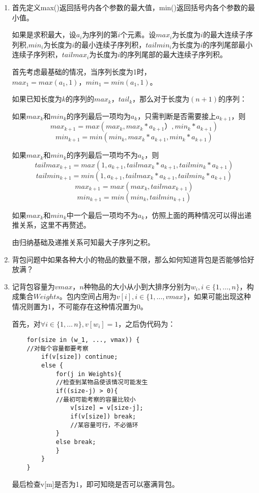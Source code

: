 \documentclass[12pt,a4paper]{article}
\makeatletter
\newtheorem*{solution}{Solution}
\theoremstyle{definition}
\renewenvironment{solution}[1][Solution] {\par\pushQED{\qed}\normalfont\topsep6\p@\@plus6\p@\relax\trivlist\item[\hskip\labelsep\bfseries#1\@addpunct{.}]\ignorespaces}{\popQED\endtrivlist\@endpefalse} \makeatother
\makeatother
\begin{document}
\begin{enumerate}
\begin{solution}
	首先定义max()返回括号内各个参数的最大值，min()返回括号内各个参数的最小值。
	
	如果是求积最大，设$a_i$为序列的第$i$个元素。设$max_{i}$为长度为$i$的最大连续子序列积,$min_{i}$为长度为$i$的最小连续子序列积，$tailmin_{i}$为长度为$i$的序列尾部最小连续子序列积，$tailmax_{i}$为长度为$i$的序列尾部的最大连续子序列积。

	首先考虑最基础的情况，当序列长度为1时，$max_{1}=max(a_1,1)，min_1=min(a_1,1)$。
	
	如果已知长度为$k$的序列的$max_{k}，tail_{k}$，那么对于长度为$(n+1)$的序列：
	
	如果$max_k$和$min_k$的序列最后一项均为$a_k$，只需判断是否需要接上$a_{k+1}$，则$$max_{k+1}=max(max_k,max_{k}*a_{k+1}）,min_{k}*a_{k+1})$$ $$min_{k+1}=min(min_k,max_{k}*a_{k+1},min_{k}*a_{k+1})$$
	
	如果$max_k$和$min_k$的序列最后一项均不为$a_k$，则$$tailmax_{k+1}=max(1,a_{k+1},tailmax_k*a_{k+1},tailmin_{k}*a_{k+1})$$ $$tailmin_{k+1}=min(1,a_{k+1},tailmax_{k}*a_{k+1},tailmin_{k}*a_{k+1})$$ $$max_{k+1}=max(max_k,tailmax_{k+1})$$ $$min_{k+1}=min(min_k,tailmin_{k+1})$$
	
	如果$max_k$和$min_k$中一个最后一项均不为$a_k$，仿照上面的两种情况可以得出递推关系，这里不再赘述。
	
	由归纳基础及递推关系可知最大子序列之积。
\end{solution}

\item 背包问题中如果各种大小的物品的数量不限，那么如何知道背包是否能够恰好放满？

\begin{solution}
	记背包容量为$vmax$，$n$种物品的大小从小到大排序分别为$w_i,i\in\{1,\ldots,n\}$，构成集合$Weights$。包内空间占用为$v[i],i\in\{1,\ldots,vmax\}$，如果可能出现这种情况则置为1，不可能存在这种情况置为0。
	
	首先，对$\forall i\in \{1,\ldots\,n\},v[w_i]=1$，之后伪代码为：
	\begin{lstlisting}
	for(size in (w_1, ..., vmax)) {
	//对每个容量都要考察
		if(v[size]) continue; 
		else {
			for(j in Weights){
			//检查到某物品使该情况可能发生
			if((size-j) > 0){
			//最初可能考察的容量比较小
				v[size] = v[size-j];
				if(v[size]) break;
				//某容量可行，不必循环
			} 
			else break;
			}
		}
	}
	\end{lstlisting}
	最后检查v[m]是否为1，即可知晓是否可以塞满背包。
\end{solution}


\end{enumerate}
\end{document}
